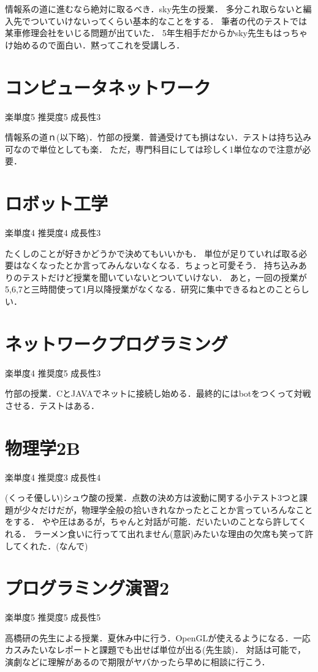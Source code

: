 \documentclass[titlepage]{jarticle}
\begin{document}
情報系の道に進むなら絶対に取るべき．sky先生の授業．
多分これ取らないと編入先でついていけないってくらい基本的なことをする．
筆者の代のテストでは某車修理会社をいじる問題が出ていた．
5年生相手だからかsky先生もはっちゃけ始めるので面白い．黙ってこれを受講しろ．

\section*{コンピュータネットワーク}
楽単度5
推奨度5
成長性3

情報系の道ｎ(以下略)．竹部の授業．普通受けても損はない．テストは持ち込み可なので単位としても楽．
ただ，専門科目にしては珍しく1単位なので注意が必要．
\section*{ロボット工学}
楽単度4
推奨度4
成長性3

たくしのことが好きかどうかで決めてもいいかも．
単位が足りていれば取る必要はなくなったとか言ってみんないなくなる．ちょっと可愛そう．
持ち込みありのテストだけど授業を聞いていないとついていけない．
あと，一回の授業が5,6,7と三時間使って1月以降授業がなくなる．研究に集中できるねとのことらしい．
\section*{ネットワークプログラミング}
楽単度4
推奨度5
成長性3

竹部の授業．CとJAVAでネットに接続し始める．最終的にはbotをつくって対戦させる．テストはある．
\section*{物理学2B}
楽単度4
推奨度3
成長性4

(くっそ優しい)シュウ酸の授業．点数の決め方は波動に関する小テスト3つと課題が少々だけだが，物理学全般の拾いきれなかったとことか言っていろんなことをする．
やや圧はあるが，ちゃんと対話が可能．だいたいのことなら許してくれる．
ラーメン食いに行ってて出れません(意訳)みたいな理由の欠席も笑って許してくれた．(なんで)

\section*{プログラミング演習2}
楽単度5
推奨度5
成長性5

高橋研の先生による授業．夏休み中に行う．OpenGLが使えるようになる．一応カスみたいなレポートと課題でも出せば単位が出る(先生談)．
対話は可能で，演劇などに理解があるので期限がヤバかったら早めに相談に行こう．
\end{document}
